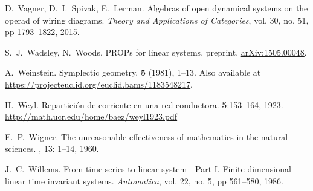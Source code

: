 \begin{thebibliography}{RSW00}

    D.\ Vagner, D.\ I.\ Spivak, E.\ Lerman.
    \newblock Algebras of open
    dynamical systems on the operad of wiring diagrams.
    \newblock \emph{Theory and
    Applications of Categories}, vol. 30, no. 51, pp 1793--1822, 2015. 





     S.\ J.\ Wadsley, N.\ Woods. 
    \newblock PROPs for linear systems.
    \newblock preprint. 
    \newblock \href{http://arxiv.org/abs/1505.00048}{arXiv:1505.00048}.

    A.\ Weinstein.
    \newblock Symplectic geometry.
     {\bf 5} (1981), 1--13.
    \newblock Also available at 	
    \href{https://projecteuclid.org/euclid.bams/1183548217}
    {https://projecteuclid.org/euclid.bams/1183548217}.

    H.\ Weyl.
    \newblock Repartici\'on de corriente en una red conductora.
     {\bf 5}:153--164, 1923.
    \newblock \href{http://math.ucr.edu/home/baez/weyl1923.pdf}{http://math.ucr.edu/home/baez/weyl1923.pdf}


    E.\ P.\ Wigner.
    \newblock The unreasonable effectiveness of mathematics in the natural
    sciences.
    , 13: 1–14,
    1960.

    J.\ C.\ Willems.
    \newblock From time series to linear system---Part I.
    Finite dimensional linear time invariant systems.
    \newblock \emph{Automatica}, vol.  22, no. 5, pp 561--580, 1986. 


\end{thebibliography}
